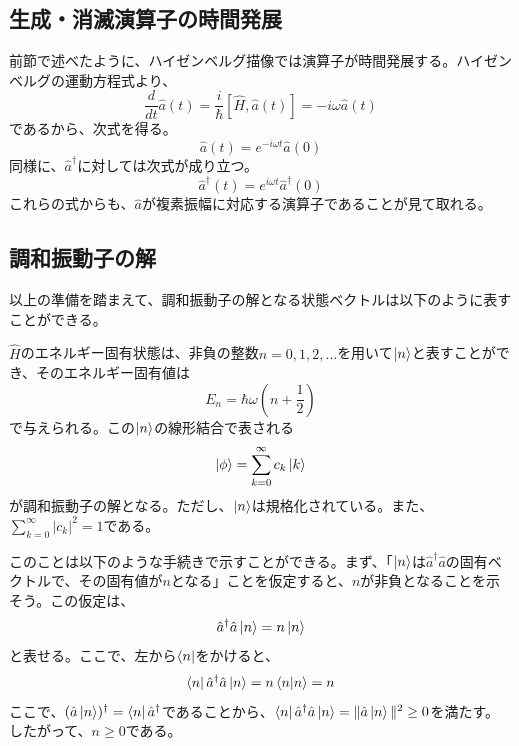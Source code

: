 \subsection{生成・消滅演算子の時間発展}
前節で述べたように、ハイゼンベルグ描像では演算子が時間発展する。ハイゼンベルグの運動方程式より、
\begin{equation}
  \frac{d}{dt}\hat a(t) = \frac{i}{\hbar}[\hat H, \hat a(t)] = -i\omega \hat a(t)
\end{equation}
であるから、次式を得る。
\begin{equation}
  \hat a(t) = e^{-i\omega t}\hat a(0)
\end{equation}
同様に、$\hat a^\dagger$に対しては次式が成り立つ。
\begin{equation}
  \hat a^\dagger(t) = e^{i\omega t}\hat a^\dagger(0)
\end{equation}
これらの式からも、$\hat a$が複素振幅に対応する演算子であることが見て取れる。

\subsection{調和振動子の解}
以上の準備を踏まえて、調和振動子の解となる状態ベクトルは以下のように表すことができる。

$\hat H$のエネルギー固有状態は、非負の整数$n = 0, 1, 2, \hdots$を用いて$\ket n$と表すことができ、そのエネルギー固有値は
\begin{equation}
  E_n = \hbar \omega \left(n + \frac 1 2\right)
  \label{eq:energy_of_eigenstate}
\end{equation}
で与えられる。この$\ket n$の線形結合で表される
\begin{equation}
  \ket \phi = \sum_{k = 0}^{\infty} c_k\ket k
  \label{eq:superposition_of_eigenstate}
\end{equation}
が調和振動子の解となる。ただし、$\ket n$は規格化されている。また、$\sum_{k = 0}^\infty |c_k|^2 = 1$である。

このことは以下のような手続きで示すことができる。まず、「$\ket n$は$\hat a^\dagger \hat a$の固有ベクトルで、その固有値が$n$となる」ことを仮定すると、$n$が非負となることを示そう。この仮定は、
\begin{equation}
  \hat a^\dagger \hat a \ket n = n\ket n
\end{equation}
と表せる。ここで、左から$\bra n$をかけると、
\begin{equation}
  \bra n \hat a^\dagger \hat a \ket n = n \braket {n|n} = n
\end{equation}
ここで、$(\hat a \ket n)^\dagger = \bra n \hat a^\dagger$であることから、$\bra n \hat a ^\dagger \hat a \ket n = \| \hat a \ket n \|^2 \geq 0$を満たす。したがって、$n \geq 0$である。

